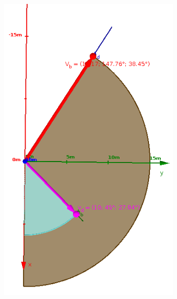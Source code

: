 \begin{figure}
	\begin{subfigure}{1.0\textwidth}
		\includegraphics[width=\linewidth]{./images/birdflocking/horizonthal}
	

\end{subfigure}
\end{figure}
